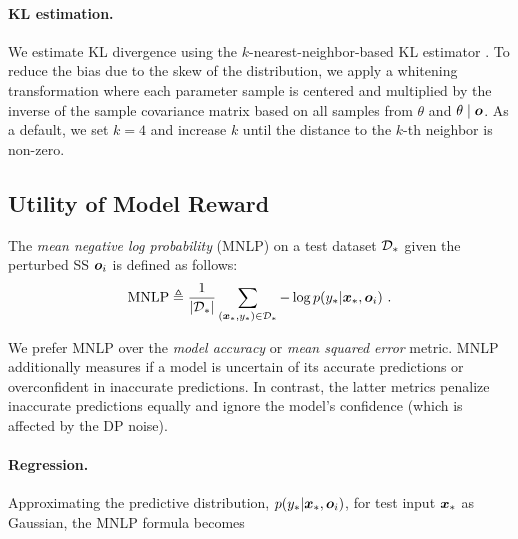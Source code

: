 \documentclass{article}
\theoremstyle{plain}
\theoremstyle{definition}
\theoremstyle{remark}
\begin{document}
\paragraph{KL estimation.}

We estimate KL divergence using the $k$-nearest-neighbor-based KL estimator \cite{perez2008kl}.
To reduce the bias due to the skew of the distribution, we apply a whitening transformation \cite{wang2009kl} where each parameter sample is centered and multiplied by the inverse of the sample covariance matrix based on all samples from $\theta$ and $\theta\mid {\bm{o}}$.
As a default, we set $k=4$ and increase $k$ until the distance to the $k$-th neighbor is non-zero.

\subsection{Utility of Model Reward}\label{app:exp-loss}

The \emph{mean negative log probability} (MNLP) on a test dataset ${\mathcal{D}}_*$ given the perturbed SS ${\bm{o}}_i$ is defined as follows:
\begin{equation*}
\text{MNLP} \triangleq  \displaystyle\frac{1}{|{\mathcal{D}}_*|} \sum_{({\bm{x}}_*, y_*) \in {\mathcal{D}}_*} {-\log p(y_* |{\bm{x}}_*, {\bm{o}}_i)}\ . 
\end{equation*}

We prefer MNLP over the \emph{model accuracy} or \emph{mean squared error} metric. MNLP additionally measures if a model is uncertain of its accurate predictions or overconfident in inaccurate predictions. In contrast, the latter metrics penalize inaccurate predictions equally and ignore the model's confidence (which is affected by the DP noise).

\paragraph{Regression.} 
Approximating the predictive distribution, $p(y_* |{\bm{x}}_*, {\bm{o}}_i)$, for test input ${\bm{x}}_*$ as Gaussian, the MNLP formula becomes
\end{document}
